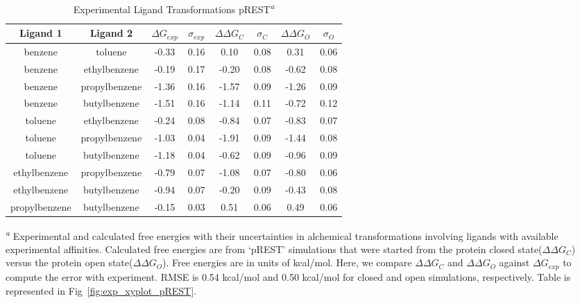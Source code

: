 \begin{table}[!htb]
\centering
\caption{Experimental Ligand Transformations pREST\textsuperscript{\emph{a}}}
\label{tbl:exp_pREST_set}
\begin{tabular}{|c|c|c|c|c|c|c|c|}
\hline
\textbf{Ligand 1} & \textbf{Ligand 2} & \boldmath$\Delta G_{exp}$  & \boldmath$\sigma_{exp}$ & \boldmath$\Delta\Delta G_{C}$ & \boldmath$\sigma_{C}$ & \boldmath$\Delta\Delta G_{O}$ & \boldmath$\sigma_{O}$ \\ \hline
benzene         & toluene         & -0.33 & 0.16  & 0.10  & 0.08  & 0.31  & 0.06          \\ \hline
benzene         & ethylbenzene    &-0.19  & 0.17  & -0.20 & 0.08  & -0.62 & 0.08          \\ \hline
benzene         & propylbenzene & -1.36 & 0.16  & -1.57 & 0.09  & -1.26 & 0.09         \\ \hline
benzene         & butylbenzene  & -1.51 & 0.16  & -1.14 & 0.11  & -0.72 & 0.12         \\ \hline
toluene         & ethylbenzene    & -0.24 & 0.08  & -0.84 & 0.07  & -0.83 & 0.07          \\ \hline
toluene         & propylbenzene & -1.03 & 0.04  & -1.91 & 0.09  & -1.44 & 0.08          \\ \hline
toluene         & butylbenzene  & -1.18 & 0.04  & -0.62 & 0.09  & -0.96 & 0.09          \\ \hline
ethylbenzene    & propylbenzene & -0.79 & 0.07  & -1.08 & 0.07  & -0.80 & 0.06         \\ \hline
ethylbenzene    & butylbenzene  & -0.94 & 0.07  & -0.20 & 0.09  & -0.43 & 0.08         \\ \hline
propylbenzene & butylbenzene  & -0.15 & 0.03  & 0.51  & 0.06  & 0.49  & 0.06       \\ \hline
\end{tabular}

\textsuperscript{\emph{a}} Experimental and calculated free energies with their uncertainties in alchemical transformations involving ligands with available experimental affinities.
Calculated free energies are from `pREST' simulations that were started from the protein closed state(\boldmath$\Delta\Delta G_{C}$) versus the protein open state(\boldmath$\Delta\Delta G_{O}$). 
Free energies are in units of kcal/mol.
Here, we compare \boldmath$\Delta\Delta G_{C}$ and \boldmath$\Delta\Delta G_{O}$ against \boldmath$\Delta G_{exp}$ to compute the error with experiment.
RMSE is 0.54 kcal/mol and 0.50 kcal/mol for closed and open simulations, respectively.
Table is represented in Fig~\ref{fig:exp_xyplot_pREST}.
\end{table}
